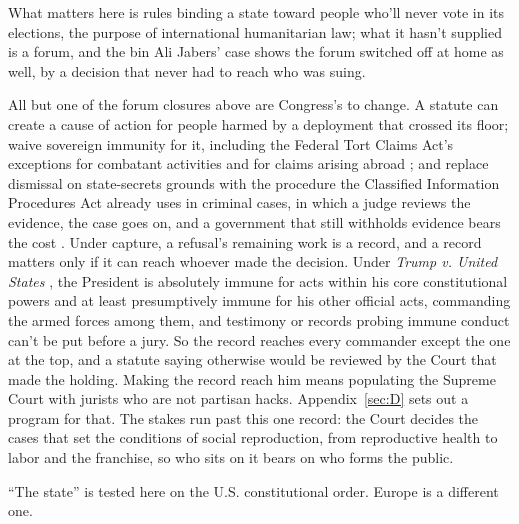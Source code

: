 What matters here is rules binding a state toward people who'll never vote in its elections, the purpose of international humanitarian law; what it hasn't supplied is a forum, and the bin Ali Jabers' case shows the forum switched off at home as well, by a decision that never had to reach who was suing.

All but one of the forum closures above are Congress's to change. A statute can create a cause of action for people harmed by a deployment that crossed its floor; waive sovereign immunity for it, including the Federal Tort Claims Act's exceptions for combatant activities and for claims arising abroad \autocite{usc2680}; and replace dismissal on state-secrets grounds with the procedure the Classified Information Procedures Act already uses in criminal cases, in which a judge reviews the evidence, the case goes on, and a government that still withholds evidence bears the cost \autocite{cipa1980}.
Under capture, a refusal's remaining work is a record, and a record matters only if it can reach whoever made the decision. Under \emph{Trump v. United States} \autocite{trump2024immunity}, the President is absolutely immune for acts within his core constitutional powers and at least presumptively immune for his other official acts, commanding the armed forces among them, and testimony or records probing immune conduct can't be put before a jury. So the record reaches every commander except the one at the top, and a statute saying otherwise would be reviewed by the Court that made the holding. Making the record reach him means populating the Supreme Court with jurists who are not partisan hacks. Appendix~\ref{sec:D} sets out a program for that. The stakes run past this one record: the Court decides the cases that set the conditions of social reproduction, from reproductive health to labor and the franchise, so who sits on it bears on who forms the public.

“The state” is tested here on the U.S. constitutional order. Europe is a different one.

